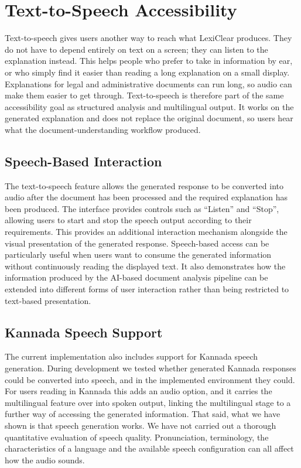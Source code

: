 \documentclass[12pt,a4paper,oneside]{report}
\begin{document}
\section{Text-to-Speech Accessibility}

Text-to-speech gives users another way to reach what LexiClear produces. They do not have to depend entirely on text on a screen; they can listen to the explanation instead. This helps people who prefer to take in information by ear, or who simply find it easier than reading a long explanation on a small display. Explanations for legal and administrative documents can run long, so audio can make them easier to get through. Text-to-speech is therefore part of the same accessibility goal as structured analysis and multilingual output. It works on the generated explanation and does not replace the original document, so users hear what the document-understanding workflow produced.

\subsection{Speech-Based Interaction}

The text-to-speech feature allows the generated response to be converted
into audio after the document has been processed and the required explanation
has been produced. The interface provides controls such as ``Listen'' and
``Stop'', allowing users to start and stop the speech output according to
their requirements. This provides an additional interaction mechanism
alongside the visual presentation of the generated response. Speech-based
access can be particularly useful when users want to consume the generated
information without continuously reading the displayed text. It also
demonstrates how the information produced by the AI-based document analysis
pipeline can be extended into different forms of user interaction rather
than being restricted to text-based presentation.

\subsection{Kannada Speech Support}

The current implementation also includes support for Kannada speech
generation. During development we tested whether generated Kannada responses could be converted into speech, and in the implemented environment they could. For users reading in Kannada this adds an audio option, and it carries the multilingual feature over into spoken output, linking the multilingual stage to a further way of accessing the generated information. That said, what we have shown is that speech generation works. We have not carried out a thorough quantitative evaluation of speech quality. Pronunciation, terminology, the characteristics of a language and the available speech configuration can all affect how the audio sounds.
\end{document}
